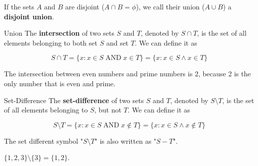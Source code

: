 If the sets $A$ and $B$ are disjoint ($A \cap B = \phi$), we call their union ($A \cup B$) a {\bf disjoint union}.

\begin{boxdefine}{Union}{}
	The {\bf intersection} of two sets $S$ and $T$, denoted by $S\cap T$, is the set of all elements belonging to both set $S$ and set $T$. We can define it as

	\[
		S \cap T = \{ x : x \in S \;\text{AND}\; x \in T\} = \{ x : x \in S \land x \in T\}
	\]
\end{boxdefine}

\begin{boxexample}{}{}
	The intersection between even numbers and prime numbers is ${2}$, because 2 is the only number that is even and prime.
\end{boxexample}

\begin{boxdefine}{Set-Difference}{}
	The {\bf set-difference} of two sets $S$ and $T$, denoted by $S \setminus T$, is the set of all elements belonging to $S$, but not $T$. We can define it as

	\[
		S \setminus T = \{x : x \in S \;\text{AND}\; x \notin T\} = \{x : x \in S \land x \notin T\}
	\]
\end{boxdefine}

\begin{boxnotation*}{}{}
	The set different symbol "$S \setminus T$" is also written as "$S-T$".
\end{boxnotation*}

\begin{boxexample}{}{}
	$\{1,2,3\} \setminus \{3\} = \{1,2\}$.
\end{boxexample}
